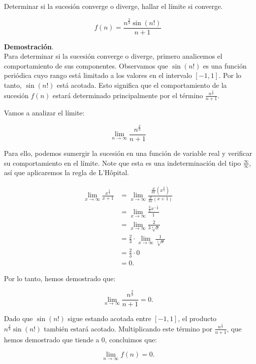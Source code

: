 \documentclass{article}
\begin{document}
    Determinar si la sucesión converge o diverge, hallar el límite si converge.

    $$
    f(n)=\frac{n^{\frac{2}{3}} \sin (n!)}{n+1}
    $$

    \textbf{Demostración}.\\

    Para determinar si la sucesión converge o diverge, primero analicemos el comportamiento de sus componentes. Observamos que $\sin (n!)$ es una función periódica cuyo rango está limitado a los valores en el intervalo $[-1,1]$. Por lo tanto, $\sin(n!)$ está acotada. Esto significa que el comportamiento de la sucesión $f(n)$ estará determinado principalmente por el término $\frac{n^{\frac{2}{3}}}{n+1}$.

    Vamos a analizar el límite:

    \[
    \lim _{n \rightarrow \infty} \frac{n^{\frac{2}{3}}}{n+1}
    \]

    Para ello, podemos sumergir la sucesión en una función de variable real y verificar su comportamiento en el límite. Note que esta es una indeterminación del tipo $\frac{\infty}{\infty}$, así que aplicaremos la regla de L'Hôpital.

    \begin{align*}
    \lim _{x \rightarrow \infty} \frac{x^{\frac{2}{3}}}{x+1} &= \lim _{x \rightarrow \infty} \frac{\frac{d}{dx} \left( x^{\frac{2}{3}} \right)}{\frac{d}{dx} \left( x+1 \right)} \\
    &= \lim _{x \rightarrow \infty} \frac{\frac{2}{3} x^{-\frac{1}{3}}}{1} \\
    &= \lim _{x \rightarrow \infty} \frac{2}{3 \sqrt[3]{x}} \\
    &= \frac{2}{3} \cdot \lim _{x \rightarrow \infty} \frac{1}{\sqrt[3]{x}} \\
    &= \frac{2}{3} \cdot 0 \\
    &= 0.
    \end{align*}

    Por lo tanto, hemos demostrado que:

    \[
    \lim _{n \rightarrow \infty} \frac{n^{\frac{2}{3}}}{n+1} = 0.
    \]

    Dado que $\sin(n!)$ sigue estando acotada entre $[-1,1]$, el producto $n^{\frac{2}{3}} \sin(n!)$ también estará acotado. Multiplicando este término por $\frac{n^{\frac{2}{3}}}{n+1}$, que hemos demostrado que tiende a 0, concluimos que:

    \[
    \lim _{n \rightarrow \infty} f(n) = 0.
    \]
\end{document}
